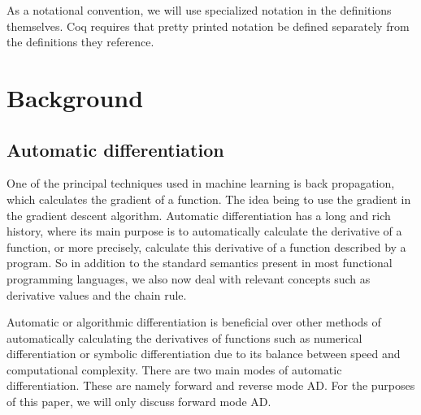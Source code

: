 \documentclass[12pt, final]{article}
\providecommand{\DIFdelbegin}{} %
\providecommand{\DIFdelend}{} %
\newcommand{\DIFscaledelfig}{0.5}
\newlength{\DIFdelgraphicswidth} %
\newlength{\DIFdelgraphicsheight} %
\newcommand{\DIFdelincludegraphics}[2][]{%
\sbox{\DIFdelgraphicsbox}{\DIFOincludegraphics[#1]{#2}}%
\settoboxwidth{\DIFdelgraphicswidth}{\DIFdelgraphicsbox} %
\settoboxtotalheight{\DIFdelgraphicsheight}{\DIFdelgraphicsbox} %
\scalebox{\DIFscaledelfig}{%
\parbox[b]{\DIFdelgraphicswidth}{\usebox{\DIFdelgraphicsbox}\\[-\baselineskip] \rule{\DIFdelgraphicswidth}{0em}}\llap{\resizebox{\DIFdelgraphicswidth}{\DIFdelgraphicsheight}{%
\setlength{\unitlength}{\DIFdelgraphicswidth}%
\begin{picture}(1,1)%
\thicklines\linethickness{2pt} %
{\color[rgb]{1,0,0}\put(0,0){\framebox(1,1){}}}%
{\color[rgb]{1,0,0}\put(0,0){\line( 1,1){1}}}%
{\color[rgb]{1,0,0}\put(0,1){\line(1,-1){1}}}%
\end{picture}%
}\hspace*{3pt}}} %
} %
\DeclareRobustCommand{\DIFdelbegin}{\DIFOdelbegin \let\includegraphics\DIFdelincludegraphics} %
\DeclareRobustCommand{\DIFdelend}{\DIFOaddend \let\includegraphics\DIFOincludegraphics} %
\begin{document}
\DIFdelbegin %

\DIFdelend As a notational convention, we will use specialized notation in the definitions themselves. Coq requires that pretty printed notation be defined separately from the definitions they reference.

\section{Background}

\subsection{Automatic differentiation}


One of the principal techniques used in machine learning is back propagation, which calculates the gradient of a function.
The idea being to use the gradient in the gradient descent algorithm\cite{Baydin2015AutomaticDI}.
Automatic differentiation has a long and rich history, where its main purpose is to automatically calculate the derivative of a function, or more precisely, calculate this derivative of a function described by a program.
So in addition to the standard semantics present in most functional programming languages, we also now deal with relevant concepts such as derivative values and the chain rule.

Automatic or algorithmic differentiation is beneficial over other methods of automatically calculating the derivatives of functions such as numerical differentiation or symbolic differentiation due to its balance between speed and computational complexity.
There are two main modes of automatic differentiation.
These are namely forward and reverse mode AD. For the purposes of this paper, we will only discuss forward mode AD.
\end{document}
